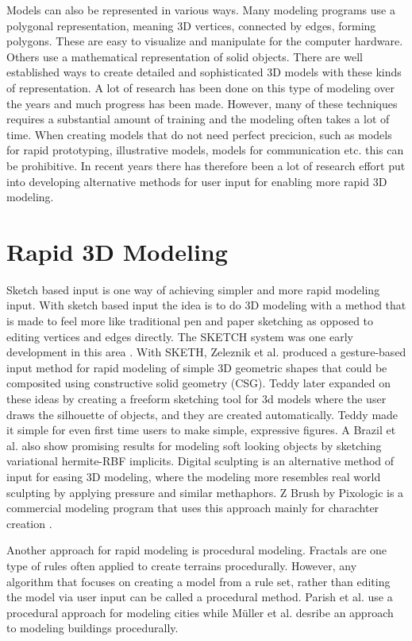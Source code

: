 \documentclass[a4paper,12pt]{report}
\begin{document}
Models can also be represented in various ways. Many modeling programs use a polygonal representation, meaning 3D vertices, connected by edges, forming polygons. These are easy to visualize and manipulate for the computer hardware.  Others use a mathematical representation of solid objects. There are well established ways to create detailed and sophisticated 3D models with these kinds of representation. A lot of research has been done on this type of modeling over the years and much progress has been made. However, many of these techniques requires a substantial amount of training and the modeling often takes a lot of time. When creating models that do not need perfect precicion, such as models for rapid prototyping, illustrative models, models for communication etc. this can be prohibitive. In recent years there has therefore been a lot of research effort put into developing alternative methods for user input for enabling more rapid 3D modeling.

\section{Rapid 3D Modeling}
 Sketch based input is one way of achieving simpler and more rapid modeling input. With sketch based input the idea is to do 3D modeling with a method that is made to feel more like traditional pen and paper sketching as opposed to editing vertices and edges directly.
The SKETCH system was one early development in this area \cite{zeleznik2007sketch}. With SKETH, Zeleznik et al. produced a gesture-based input method for rapid modeling of simple 3D geometric shapes that could be composited using constructive solid geometry (CSG). Teddy \cite{Igarashi:1999:TSI:311535.311602} later expanded on these ideas by creating a freeform sketching tool for 3d models where the user draws the silhouette of objects, and they are created automatically. Teddy made it simple for even first time users to make simple, expressive figures. A Brazil et al. \cite{brazil2010sketching} also show promising results for modeling soft looking objects by sketching variational hermite-RBF implicits.
Digital sculpting is an alternative method of input for easing 3D modeling, where the modeling more resembles real world sculpting by applying pressure and similar methaphors. Z Brush by Pixologic is a commercial modeling program that uses this approach mainly for charachter creation \cite{spencer2008zbrush}.

Another approach for rapid modeling is procedural modeling. Fractals are one type of rules often applied to create terrains procedurally.  However, any algorithm that focuses on creating a model from a rule set, rather than editing the model via user input can be called a procedural method. Parish et al. \cite{parish2001procedural} use a procedural approach for modeling cities while Müller \cite{muller2006procedural} et al. desribe an approach to modeling buildings procedurally. 
 
\end{document}
